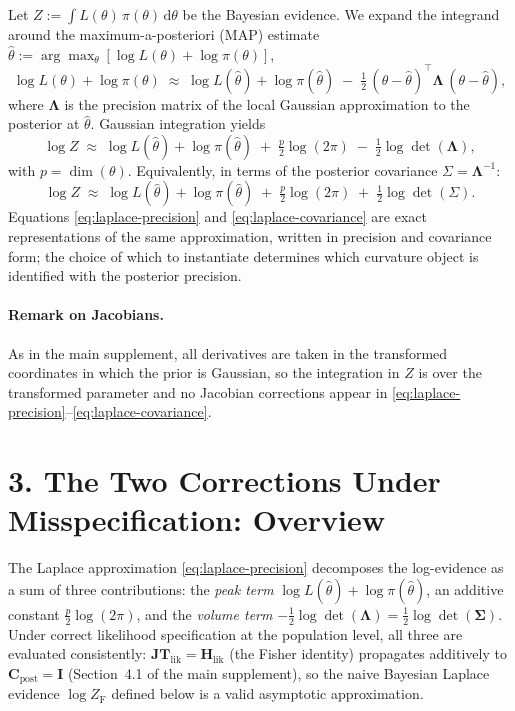 \documentclass[11pt]{article}
\begin{document}
Let $Z := \int L(\theta)\,\pi(\theta)\,\mathrm{d}\theta$ be the Bayesian evidence. We expand
the integrand around the maximum-a-posteriori (MAP) estimate
$\hat\theta := \arg\max_\theta [\log L(\theta) + \log\pi(\theta)]$,
\begin{equation}
\log L(\theta) + \log\pi(\theta)
\;\approx\;
\log L(\hat\theta) + \log\pi(\hat\theta)
\;-\;
\tfrac{1}{2}\,(\theta - \hat\theta)^\top
\boldsymbol\Lambda\,
(\theta - \hat\theta),
\label{eq:quadratic-expansion}
\end{equation}
where $\boldsymbol\Lambda$ is the precision matrix of the local Gaussian approximation
to the posterior at $\hat\theta$. Gaussian integration yields
\begin{equation}
\log Z
\;\approx\;
\log L(\hat\theta) + \log\pi(\hat\theta)
\;+\;
\tfrac{p}{2}\log(2\pi)
\;-\;
\tfrac{1}{2}\log\det(\boldsymbol\Lambda),
\label{eq:laplace-precision}
\end{equation}
with $p = \dim(\theta)$. Equivalently, in terms of the posterior covariance
$\Sigma = \boldsymbol\Lambda^{-1}$:
\begin{equation}
\log Z
\;\approx\;
\log L(\hat\theta) + \log\pi(\hat\theta)
\;+\;
\tfrac{p}{2}\log(2\pi)
\;+\;
\tfrac{1}{2}\log\det(\Sigma).
\label{eq:laplace-covariance}
\end{equation}
Equations \eqref{eq:laplace-precision} and \eqref{eq:laplace-covariance} are exact
representations of the same approximation, written in precision and covariance form;
the choice of which to instantiate determines which curvature object is identified with
the posterior precision.

\paragraph{Remark on Jacobians.}
As in the main supplement, all derivatives are taken in the transformed coordinates in
which the prior is Gaussian, so the integration in $Z$ is over the transformed parameter
and no Jacobian corrections appear in \eqref{eq:laplace-precision}--\eqref{eq:laplace-covariance}.


\section*{3. The Two Corrections Under Misspecification: Overview}

The Laplace approximation \eqref{eq:laplace-precision} decomposes the
log-evidence as a sum of three contributions: the \emph{peak term}
$\log L(\hat\theta) + \log\pi(\hat\theta)$, an additive constant
$\tfrac{p}{2}\log(2\pi)$, and the \emph{volume term}
$-\tfrac{1}{2}\log\det(\boldsymbol\Lambda) =
\tfrac{1}{2}\log\det(\boldsymbol\Sigma)$. Under correct likelihood
specification at the population level, all three are evaluated consistently:
$\mathbf{JT}_{\mathrm{lik}} = \mathbf H_{\mathrm{lik}}$ (the Fisher identity)
propagates additively to $\mathbf C_{\mathrm{post}} = \mathbf I$
(Section~4.1 of the main supplement), so the naive Bayesian Laplace evidence
$\log Z_{\mathrm{F}}$ defined below is a valid asymptotic approximation.
\end{document}
